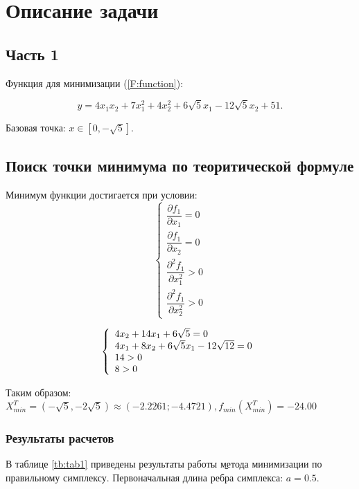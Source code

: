 \chapter{Описание задачи}
\label{cha:analysis}
\section{Часть 1}
Функция для минимизации (\eqref{F:function}):

\begin{equation}
y=4 x_{1} x_{2} + 7x_1^2 + 4x_2^2 + 6 \sqrt{5}x_1 -12\sqrt{5}x_2 + 51.
\label{F:function}
\end{equation}

Базовая точка: $x\in [0,-\sqrt{5}]$.

\section{Поиск точки минимума по теоритической формуле}
Минимум функции достигается при условии:
\[
\left\{ 
\begin{array}{l}
  \dfrac{\partial f_1}{\partial x_1} = 0 \\
  \dfrac{\partial f_1}{\partial x_2} = 0 \\
  \dfrac{\partial^2 f_1}{\partial x_1^2} > 0 \\
  \dfrac{\partial^2 f_1}{\partial x_2^2} > 0
\end{array} \right.
\]

\[
\left\{ 
\begin{array}{l l l}
	4 x_2 + 14 x_1 + 6 \sqrt{5} = 0 \\
	4 x_1 + 8 x_2 + 6 \sqrt{5} x_1 - 12 \sqrt{12} = 0 \\
	14 > 0 \\
	8 > 0
\end{array} \right.
\]

Таким образом:
$X_{min}^T = \left( -\sqrt{5}, - 2 \sqrt{5}\right) \approx (-2.2261 ; -4.4721), f_{min}(X_{min}^T) = -24.00$

\subsection{Результаты расчетов}
В таблице \ref{tb:tab1} приведены результаты работы \b{метода минимизации по правильному симплексу}. Первоначальная длина ребра симплекса: $a=0.5$.

